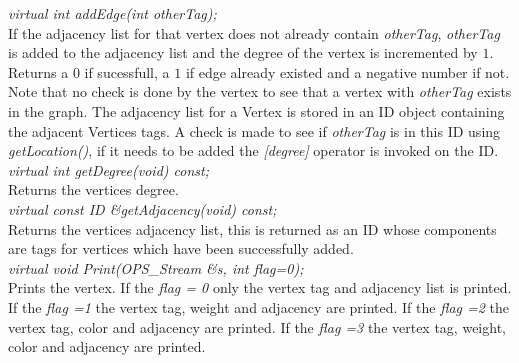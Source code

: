 {\em virtual int addEdge(int otherTag); } \\
If the adjacency list for that vertex does not already contain {\em
otherTag}, {\em otherTag} is added to the adjacency list and the
degree of the vertex is incremented by $1$. Returns a $0$ if
sucessfull, a $1$ if edge already existed and a negative number if
not. Note that no check is done by the vertex to see that a vertex
with {\em otherTag} exists in the graph. The adjacency list for a
Vertex is stored in an ID object containing the adjacent Vertices
tags. A check is made to see if {\em otherTag} is in this ID using
{\em getLocation()}, if it needs to be added the {\em [degree]}
operator is invoked on the ID. \\ 

{\em virtual int getDegree(void) const;} \\
Returns the vertices degree. \\

{\em virtual const ID \&getAdjacency(void) const;} \\
Returns the vertices adjacency list, this is returned as an ID whose
components are tags for vertices which have been successfully added.\\
    
{\em virtual void Print(OPS_Stream \&s, int flag=0);} \\
Prints the vertex. If the {\em flag = 0} only the vertex tag and
adjacency list is printed. If the {\em flag =1} the vertex tag, weight
and adjacency are printed. If the {\em flag =2} the vertex tag, color
and adjacency are printed. If the {\em flag =3} the vertex tag,
weight, color and adjacency are printed. \\  






